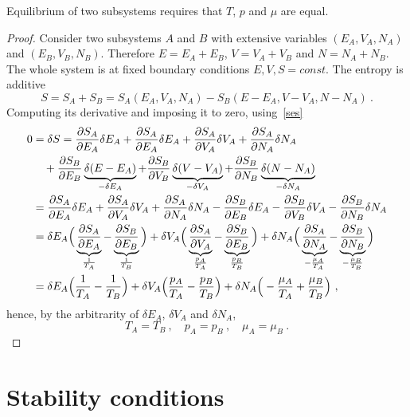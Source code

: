     Equilibrium of two subsystems requires that $T$, $p$ and $\mu$ are equal.
    \begin{proof}
        Consider two subsystems $A$ and $B$ with extensive variables $(E_A, V_A, N_A)$ and $(E_B, V_B, N_B)$. Therefore $E = E_A + E_B$, $V = V_A + V_B$ and $N = N_A + N_B$. The whole system is at fixed boundary conditions $E, V, S = const$. The entropy is additive 
        \begin{equation*}
            S = S_A + S_B = S_A(E_A, V_A, N_A) - S_B(E - E_A, V-V_A, N-N_A) ~.
        \end{equation*}
        Computing its derivative and imposing it to zero, using~\eqref{ses}
        \begin{equation*}
        \begin{aligned}
            0 & = \delta S = \frac{\partial S_A}{\partial E_A} \delta E_A + \frac{\partial S_A}{\partial E_A} \delta E_A + \frac{\partial S_A}{\partial V_A} \delta V_A + \frac{\partial S_A}{\partial N_A} \delta N_A \\ & \quad + \frac{\partial S_B}{\partial E_B} \underbrace{\delta (E - E_A)}_{- \delta E_A} + \frac{\partial S_B}{\partial V_B} \underbrace{\delta (V - V_A)}_{- \delta V_A} + \frac{\partial S_B}{\partial N_B} \underbrace{\delta (N - N_A)}_{- \delta N_A} \\ & = \frac{\partial S_A}{\partial E_A} \delta E_A + \frac{\partial S_A}{\partial V_A} \delta V_A + \frac{\partial S_A}{\partial N_A} \delta N_A - \frac{\partial S_B}{\partial E_B} \delta E_A - \frac{\partial S_B}{\partial V_B}  \delta V_A - \frac{\partial S_B}{\partial N_B} \delta N_A  \\ & = \delta E_A \Big ( \underbrace{\frac{\partial S_A}{\partial E_A}}_{\frac{1}{T_A}} - \underbrace{\frac{\partial S_B}{\partial E_B}}_{\frac{1}{T_B}} \Big) + \delta V_A \Big ( \underbrace{\frac{\partial S_A}{\partial V_A}}_{\frac{p_A}{T_A}} - \underbrace{\frac{\partial S_B}{\partial E_B}}_{\frac{p_B}{T_B}} \Big) + \delta N_A \Big (\underbrace{\frac{\partial S_A}{\partial N_A}}_{ - \frac{\mu_A}{T_A}} - \underbrace{\frac{\partial S_B}{\partial N_B}}_{- \frac{\mu_B}{T_B}} \Big) \\ & = \delta E_A \Big ( \frac{1}{T_A} - \frac{1}{T_B} \Big) + \delta V_A \Big ( \frac{p_A}{T_A} - \frac{p_B}{T_B} \Big) + \delta N_A \Big (- \frac{\mu_A}{T_A} + \frac{\mu_B}{T_B} \Big) ~,
        \end{aligned}
        \end{equation*}
        hence, by the arbitrarity of $\delta E_A$, $\delta V_A$ and $\delta N_A$,
        \begin{equation*}
            T_A = T_B ~, \quad p_A = p_B ~, \quad \mu_A = \mu_B ~.
        \end{equation*}
    \end{proof}

\section{Stability conditions}

